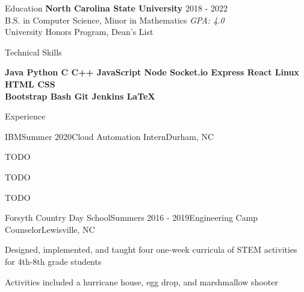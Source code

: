 \documentclass{resume} %
\begin{document}
\begin{rSection}{Education}
{\bf North Carolina State University} \hfill {2018 - 2022} \\ 
B.S. in Computer Science, Minor in Mathematics \hfill {\em GPA: 4.0}\\
University Honors Program, Dean's List \\

\end{rSection}


\begin{rSection}{Technical Skills}

	\textbf{
		{Java} \textbar
		{ Python} \textbar
		{ C} \textbar
		{ C++} \textbar
		{ JavaScript} \textbar
		{ Node} \textbar
		{ Socket.io} \textbar
		{ Express} \textbar
		{ React} \textbar
		{ Linux} \textbar
		{ HTML} \textbar
		{ CSS} \\
		{ Bootstrap} \textbar
		{ Bash} \textbar
		{ Git} \textbar
		{ Jenkins} \textbar
		{ LaTeX}
	}
	
\end{rSection}


\begin{rSection}{Experience}

	\begin{rSubsection}{IBM}{Summer 2020}{Cloud Automation Intern}{Durham, NC}
		\item TODO
		\item TODO
		\item TODO
	\end{rSubsection}

	\begin{rSubsection}{Forsyth Country Day School}{Summers 2016 - 2019}{Engineering Camp Counselor}{Lewisville, NC}
		\item Designed, implemented, and taught four one-week curricula of STEM activities for 4th-8th grade students
		\item Activities included a hurricane house, egg drop, and marshmallow shooter
	\end{rSubsection}
	
\end{rSection}
\end{document}
